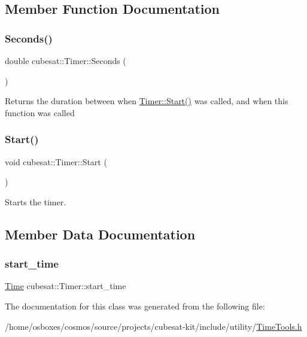 \subsection{Member Function Documentation}
\mbox{\label{classcubesat_1_1Timer_adf22bfb3a1acada570439abda1bc5741}} 
\subsubsection{\texorpdfstring{Seconds()}{Seconds()}}
{\footnotesize\ttfamily double cubesat\+::\+Timer\+::\+Seconds (\begin{DoxyParamCaption}{ }\end{DoxyParamCaption})\hspace{0.3cm}{\ttfamily [inline]}}

Returns the duration between when \hyperlink{classcubesat_1_1Timer_a5fe22b19f80d819e4255ca38a3781739}{Timer\+::\+Start()} was called, and when this function was called \mbox{\label{classcubesat_1_1Timer_a5fe22b19f80d819e4255ca38a3781739}} 
\subsubsection{\texorpdfstring{Start()}{Start()}}
{\footnotesize\ttfamily void cubesat\+::\+Timer\+::\+Start (\begin{DoxyParamCaption}{ }\end{DoxyParamCaption})\hspace{0.3cm}{\ttfamily [inline]}}



Starts the timer. 



\subsection{Member Data Documentation}
\mbox{\label{classcubesat_1_1Timer_add769135485d41136939ec3d6ed8b1d7}} 
\subsubsection{\texorpdfstring{start\+\_\+time}{start\_time}}
{\footnotesize\ttfamily \hyperlink{classcubesat_1_1Time}{Time} cubesat\+::\+Timer\+::start\+\_\+time\hspace{0.3cm}{\ttfamily [private]}}



The documentation for this class was generated from the following file\+:\begin{DoxyCompactItemize}
\item 
/home/osboxes/cosmos/source/projects/cubesat-\/kit/include/utility/\hyperlink{TimeTools_8h}{Time\+Tools.\+h}\end{DoxyCompactItemize}
